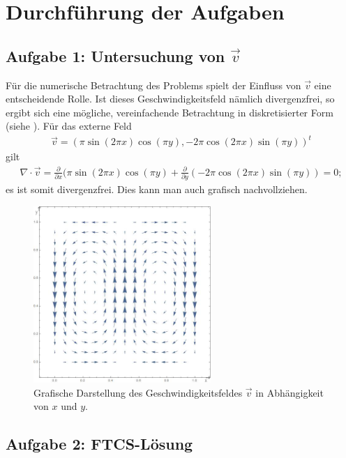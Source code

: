 \documentclass[12pt,a4paper,titlepage,headinclude,bibtotoc]{scrartcl}
\begin{document}
\section{Durchführung der Aufgaben}
\subsection{Aufgabe 1: Untersuchung von $\vec{v}$}
\label{sec:task1}
Für die numerische Betrachtung des Problems spielt der Einfluss von $\vec{v}$ eine entscheidende Rolle. Ist dieses Geschwindigkeitsfeld nämlich divergenzfrei, so ergibt sich eine mögliche, vereinfachende Betrachtung in diskretisierter Form (siehe ). Für das externe Feld
\begin{align*}
\vec{v} = (\pi \sin(2\pi x) \cos(\pi y), -2 \pi \cos(2\pi x) \sin(\pi y))^t
\end{align*}
gilt
\begin{align*}
\nabla \cdot \vec{v} = \frac{\partial}{\partial x} (\pi \sin(2\pi x) \cos(\pi y) + \frac{\partial}{\partial y} (-2 \pi \cos(2\pi x) \sin(\pi y)) = 0;
\end{align*}
es ist somit divergenzfrei. Dies kann man auch grafisch nachvollziehen.
\begin{figure}[H]
 \centering
   \includegraphics[width=0.6\textwidth]{res/task1.png}
   \caption{Grafische Darstellung des Geschwindigkeitsfeldes $\vec{v}$ in Abhängigkeit von $x$ und $y$.}
 \label{fig:aufbaue_bild}
\end{figure}

\subsection{Aufgabe 2: FTCS-Lösung}
\label{sec:task2}
\end{document}
